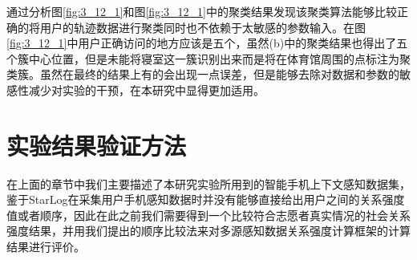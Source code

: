 \par 通过分析图\ref{fig:3_12_1}和图\ref{fig:3_12_1}中的聚类结果发现该聚类算法能够比较正确的将用户的轨迹数据进行聚类同时也不依赖于太敏感的参数输入。在图\ref{fig:3_12_1}中用户正确访问的地方应该是五个，虽然(b)中的聚类结果也得出了五个簇中心位置，但是未能将寝室这一簇识别出来而是将在体育馆周围的点标注为聚类簇。虽然在最终的结果上有的会出现一点误差，但是能够去除对数据和参数的敏感性减少对实验的干预，在本研究中显得更加适用。


\section{实验结果验证方法}
\label{sec:section5-2}
在上面的章节中我们主要描述了本研究实验所用到的智能手机上下文感知数据集，鉴于StarLog在采集用户手机感知数据时并没有能够直接给出用户之间的关系强度值或者顺序，因此在此之前我们需要得到一个比较符合志愿者真实情况的社会关系强度结果，并用我们提出的顺序比较法来对多源感知数据关系强度计算框架的计算结果进行评价。
